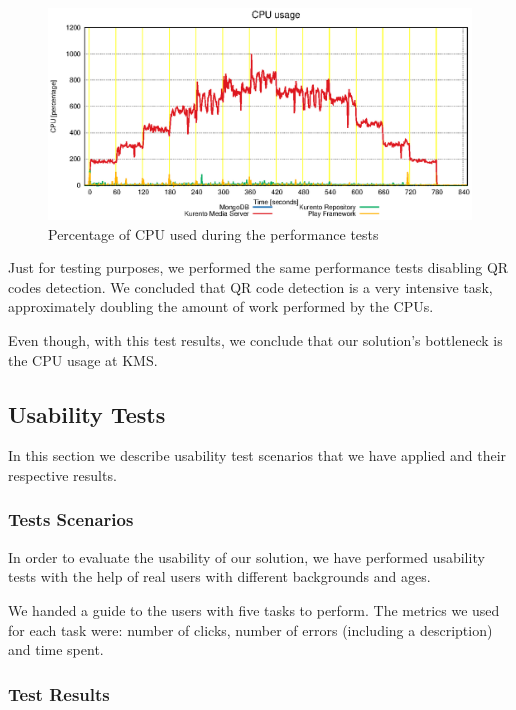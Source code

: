 \documentclass[10pt,conference]{IEEEtran}
\begin{document}
\begin{figure}
  \centering
  \includegraphics[width=\linewidth]{stats/test_full_features_cpu.eps}
  \caption{Percentage of CPU used during the performance tests}
  \label{fig:test_full_features_cpu}
\end{figure}

  Just for testing purposes, we performed the same performance tests disabling \gls{QR} codes detection. We concluded that \gls{QR} code detection is a very intensive task, approximately doubling the amount of work performed by the \gls{CPU}s.

	Even though, with this test results, we conclude that our solution's bottleneck is the \gls{CPU} usage at \gls{KMS}.



\subsection {Usability Tests}
     In this section we describe usability test scenarios that we have applied and their respective results.


    \subsubsection{Tests Scenarios}

      In order to evaluate the usability of our solution, we have performed usability tests with the help of real users with different backgrounds and ages.

      We handed a guide to the users with five tasks to perform. The metrics we used for each task were: number of clicks, number of errors (including a description) and time spent. 

  \subsubsection{Test Results}
\end{document}
